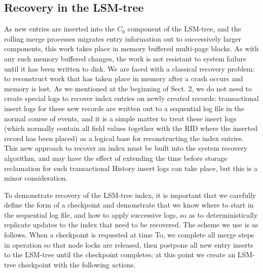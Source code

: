 \documentclass[a4paper,12pt,notitlepage,twoside,openright]{article}
\begin{document}
\hypertarget{recovery-in-the-lsm-tree}{%
\subsection{Recovery in the LSM-tree}\label{recovery-in-the-lsm-tree}}


As new entries are inserted into the \(C_0\) component of the LSM-tree, and
the rolling merge processes migrates entry information out to
successively larger components, this work takes place in memory buffered
multi-page blocks. As with any such memory buffered changes, the work is
not resistant to system failure until it has been written to disk. We
are faced with a classical recovery problem: to reconstruct work that
has taken place in memory after a crash occurs and memory is lost. As we
mentioned at the beginning of Sect. 2, we do not need to create special
logs to recover index entries on newly created records: transactional
insert logs for these new records are written out to a sequential log
file in the normal course of events, and it is a simple matter to treat
these insert logs (which normally contain all field values together with
the RID where the inserted record has been placed) as a logical base for
reconstructing the index entries. This new approach to recover an index
must be built into the system recovery algorithm, and may have the
effect of extending the time before storage reclamation for such
transactional History insert logs can take place, but this is a minor
consideration.

To demonstrate recovery of the LSM-tree index, it is important that we
carefully define the form of a checkpoint and demonstrate that we know
where to start in the sequential log file, and how to apply successive
logs, so as to deterministically replicate updates to the index that
need to be recovered. The scheme we use is as follows. When a checkpoint
is requested at time To, we complete all merge steps in operation so
that node locks are released, then postpone all new entry inserts to the
LSM-tree until the checkpoint completes; at this point we create an
LSM-tree checkpoint with the following actions.
\end{document}
